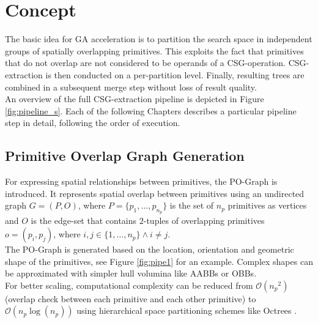 \section{Concept}
The basic idea for \ac{GA} acceleration is to partition the search space in independent groups of spatially overlapping primitives.
This exploits the fact that primitives that do not overlap are not considered to be operands of a \ac{CSG}-operation.
\ac{CSG}-extraction is then conducted on a per-partition level. 
Finally, resulting trees are combined in a subsequent merge step without loss of result quality. 
\\
An overview of the full \ac{CSG}-extraction pipeline is depicted in Figure \ref{fig:pipeline_s}. 
Each of the following Chapters describes a particular pipeline step in detail, following the order of execution.

\subsection{Primitive Overlap Graph Generation}
\label{ch:pog}
For expressing spatial relationships between primitives, the \ac{PO}-Graph is introduced.
It represents spatial overlap between primitives using an undirected graph $G=(P,O)$, where $P = \{p_1,\dots,p_{n_p}\}$ is the set of $n_p$ primitives as vertices and $O$ is the edge-set that contains $2$-tuples of overlapping primitives $o=(p_i,p_j)$, where $i,j \in \{1,\dots,n_p\} \land i \ne j$. 
\\
The \ac{PO}-Graph is generated based on the location, orientation and geometric shape of the primitives, see Figure \ref{fig:pipe1} for an example.
Complex shapes can be approximated with simpler hull volumina like \acp{AABB} or \acp{OBB}.
\\
For better scaling, computational complexity can be reduced from $\mathcal{O}({n_p}^2)$ (overlap check between each primitive and each other primitive) to $\mathcal{O}(n_p\log(n_p))$ using hierarchical space partitioning schemes like Octrees \cite{meagher1982Octree}.
